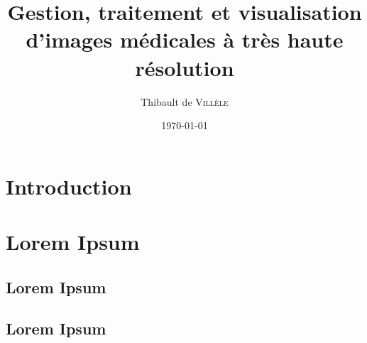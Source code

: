 \documentclass[utf8]{stageM2R}
\author{Thibault de \textsc{Villèle}}
\title{Gestion, traitement et visualisation d'images médicales à très haute résolution}
\date{\today}
\begin{document}
\frontmatter  %
\maketitle    %
\cleardoublepage
\tableofcontents %
\mainmatter  %



\chapter{Introduction}
\lipsum
\chapter{Lorem Ipsum}
\lipsum
\section{Lorem Ipsum}
\lipsum
\section{Lorem Ipsum}
\lipsum
\end{document}

